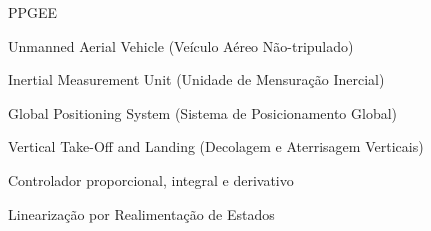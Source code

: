 \documentclass[repeatfields,xlists,xpacks,oneside,yearsonly]{ufrgscca}
\begin{document}
\setcounter{tocdepth}{3}
\listoffigures
\listoftables
\begin{listofabbrv}{PPGEE}
\item[UAV] Unmanned Aerial Vehicle (Veículo Aéreo Não-tripulado)
\item[IMU] Inertial Measurement Unit (Unidade de Mensuração Inercial)
\item[GPS] Global Positioning System (Sistema de Posicionamento Global)
\item[VTOL] Vertical Take-Off and Landing (Decolagem e Aterrisagem Verticais)
\item[PID] Controlador proporcional, integral e derivativo
\item[LRE] Linearização por Realimentação de Estados
\end{listofabbrv}
\tableofcontents










\printbibliography

\appendix

\end{document}
